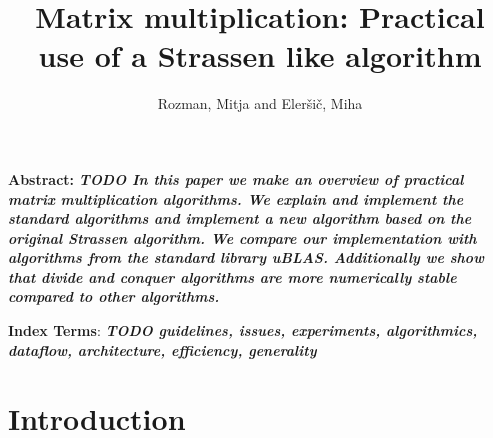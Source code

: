 \documentclass[a4paper,11pt]{article}
\title{Matrix multiplication: Practical use of a Strassen like algorithm}
\author{Rozman, Mitja and Eleršič, Miha}
\date{}
\renewenvironment{abstract}
{\begin{spacing}{1}\small\textbf{Abstract:}\bfseries\itshape}
{\end{spacing}}
\begin{document}
\maketitle



\begingroup
\renewcommand\thefootnote{}
\endgroup

\begin{abstract} %
TODO
In this paper we make an overview of practical matrix multiplication algorithms.
We explain and implement the standard algorithms and implement a new algorithm based on the original Strassen algorithm.
We compare our implementation with algorithms from the standard library uBLAS. Additionally we show that divide and conquer algorithms are more numerically stable compared to other algorithms.
\end{abstract}
\vspace{0.5cm}
\begin{spacing}{0.9}
\small\textbf{Index Terms}: \textbf{\textit{TODO guidelines, issues, experiments, algorithmics, dataflow, architecture, efficiency, generality}}
\end{spacing}


\section{Introduction}



\end{document}
